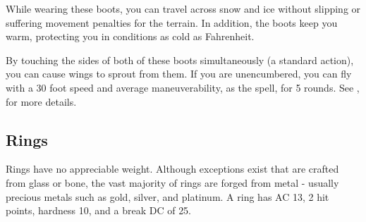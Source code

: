 
 While wearing these boots, you can travel across snow and ice without slipping or suffering movement penalties for the terrain.
In addition, the boots keep you warm, protecting you in conditions as cold as  Fahrenheit.


 By touching the sides of both of these boots simultaneously (a standard action), you can cause wings to sprout from them.
If you are unencumbered, you can fly with a 30 foot speed and average maneuverability, as the  spell, for 5 rounds.
See , for more details.


\subsection{Rings}

 Rings have no appreciable weight.
Although exceptions exist that are crafted from glass or bone, the vast majority of rings are forged from metal - usually precious metals such as gold, silver, and platinum.
A ring has AC 13, 2 hit points, hardness 10, and a break DC of 25.

